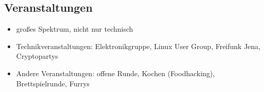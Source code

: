 \documentclass[a4paper,12pt,twoside]{scrartcl}
\begin{document}
\subsection*{Veranstaltungen}
\begin{itemize}
\item großes Spektrum, nicht nur technisch
\item Technikveranstaltungen: Elektronikgruppe, Linux User Group, Freifunk Jena, Cryptopartys
\item Andere Veranstaltungen: offene Runde, Kochen (Foodhacking), Brettspielrunde,  Furrys
\end{itemize}
\end{document}
